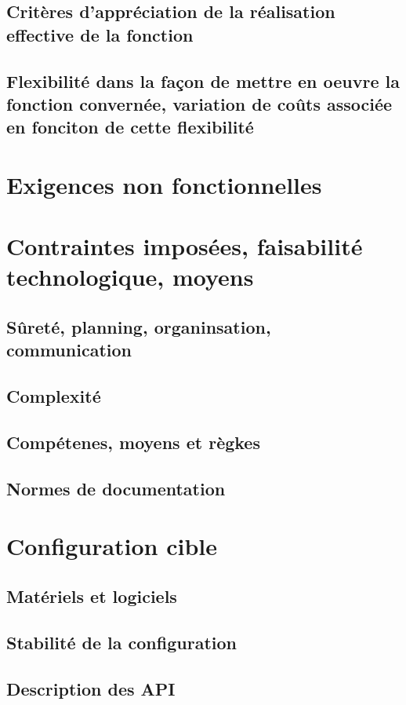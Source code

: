 \subsection{Critères d'appréciation de la réalisation effective de la fonction}
\subsection{Flexibilité dans la façon de mettre en oeuvre la fonction convernée, variation de coûts associée en fonciton de cette flexibilité}

\section{Exigences non fonctionnelles}

\section{Contraintes imposées, faisabilité technologique, moyens}
\subsection{Sûreté, planning, organinsation, communication}
\subsection{Complexité}
\subsection{Compétenes, moyens et règkes}
\subsection{Normes de documentation}

\section{Configuration cible}
\subsection{Matériels et logiciels}
\subsection{Stabilité de la configuration}
\subsection{Description des API}

